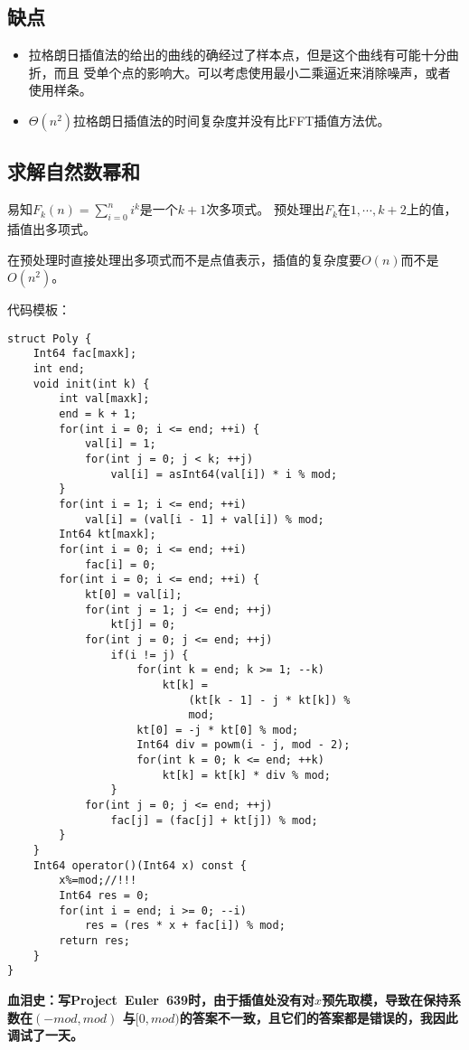 \subsection{缺点}
\begin{itemize}
    \item 拉格朗日插值法的给出的曲线的确经过了样本点，但是这个曲线有可能十分曲折，而且
    受单个点的影响大。可以考虑使用最小二乘逼近来消除噪声，或者使用样条。
    \item $\Theta(n^2)$拉格朗日插值法的时间复杂度并没有比FFT插值方法优。
\end{itemize}
\subsection{求解自然数幂和}\label{psum}
易知$F_k(n)=\displaystyle \sum_{i=0}^n{i^k}$是一个$k+1$次多项式。
预处理出$F_k$在$1,\cdots,k+2$上的值，插值出多项式。

在预处理时直接处理出多项式而不是点值表示，插值的复杂度要$O(n)$而不是$O(n^2)$。

代码模板：
\begin{lstlisting}
struct Poly {
    Int64 fac[maxk];
    int end;
    void init(int k) {
        int val[maxk];
        end = k + 1;
        for(int i = 0; i <= end; ++i) {
            val[i] = 1;
            for(int j = 0; j < k; ++j)
                val[i] = asInt64(val[i]) * i % mod;
        }
        for(int i = 1; i <= end; ++i)
            val[i] = (val[i - 1] + val[i]) % mod;
        Int64 kt[maxk];
        for(int i = 0; i <= end; ++i)
            fac[i] = 0;
        for(int i = 0; i <= end; ++i) {
            kt[0] = val[i];
            for(int j = 1; j <= end; ++j)
                kt[j] = 0;
            for(int j = 0; j <= end; ++j)
                if(i != j) {
                    for(int k = end; k >= 1; --k)
                        kt[k] =
                            (kt[k - 1] - j * kt[k]) %
                            mod;
                    kt[0] = -j * kt[0] % mod;
                    Int64 div = powm(i - j, mod - 2);
                    for(int k = 0; k <= end; ++k)
                        kt[k] = kt[k] * div % mod;
                }
            for(int j = 0; j <= end; ++j)
                fac[j] = (fac[j] + kt[j]) % mod;
        }
    }
    Int64 operator()(Int64 x) const {
        x%=mod;//!!!
        Int64 res = 0;
        for(int i = end; i >= 0; --i)
            res = (res * x + fac[i]) % mod;
        return res;
    }
}
\end{lstlisting}

{\bfseries 血泪史：写Project~Euler~639时，由于插值处没有对$x$预先取模，导致在保持系数在$(-mod,mod)$
与$[0,mod)$的答案不一致，且它们的答案都是错误的，我因此调试了一天。}
